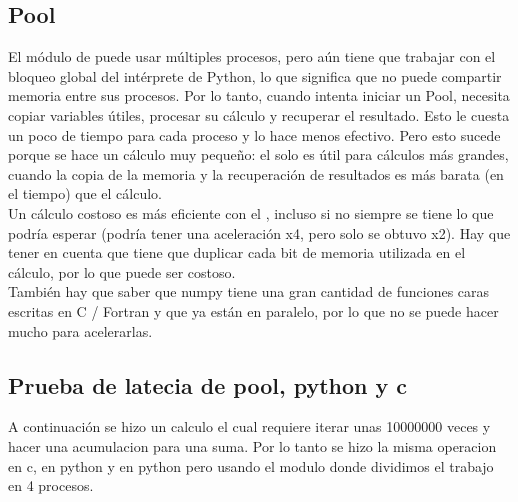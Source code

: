 \subsection{Pool}
    El módulo de  puede usar múltiples procesos, pero aún
    tiene que trabajar con el bloqueo global del intérprete de Python, lo que
    significa que no puede compartir memoria entre sus procesos. Por lo tanto,
    cuando intenta iniciar un Pool, necesita copiar variables útiles, procesar
    su cálculo y recuperar el resultado. Esto le cuesta un poco de tiempo para
    cada proceso y lo hace menos efectivo. Pero esto sucede porque se hace
    un cálculo muy pequeño: el  solo es útil para cálculos
    más grandes, cuando la copia de la memoria y la recuperación de resultados
    es más barata (en el tiempo) que el cálculo.\\

    Un cálculo costoso es más eficiente con el , incluso
    si no siempre se tiene lo que podría esperar (podría tener una aceleración x4,
    pero solo se obtuvo x2). Hay que tener en cuenta que  tiene que
    duplicar cada bit de memoria utilizada en el cálculo, por lo que puede ser
    costoso.\\
    También hay que saber que numpy tiene una gran cantidad de funciones
    caras escritas en C / Fortran y que ya están en paralelo, por lo que no
    se puede hacer mucho para acelerarlas.
\subsection{Prueba de latecia de pool, python y c}
    A continuación se hizo un calculo el cual requiere iterar unas 10000000 veces
    y hacer una acumulacion para una suma. Por lo tanto se hizo la misma operacion
    en c, en python y en python pero usando el modulo  donde dividimos el
    trabajo en 4 procesos.
    \def\text{tiempos de la pruebas en segundos}
    \def\path{test_pool.png}
    \def\scale{.6}
    